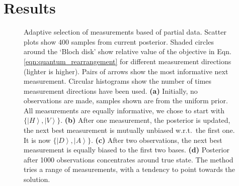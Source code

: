 
\section{Results}

\begin{figure}

	\caption[Illustration of adaptive tomography on a single-photon system]{Adaptive selection of measurements based of partial data. Scatter plots show 400 samples from current posterior. Shaded circles around the `Bloch disk' show relative value of the objective in Eqn.\,\eqref{eqn:quantum_rearrangement} for different measurement directions (lighter is higher). Pairs of arrows show the most informative next measurement. Circular histograms show the number of times measurement directions have been used. \textbf{(a)}  Initially, no observations are made, samples shown are from the uniform prior. All measurements are equally informative, we chose to start with $\{\left\vert H\right\rangle,\left\vert V\right\rangle\}$. \textbf{(b)}  After one measurement, the posterior is updated, the next best measurement is mutually unbiased w.r.t.\ the first one. It is now $\{\left\vert D\right\rangle,\left\vert A\right\rangle\}$. \textbf{(c)} After two observations, the next best measurement is equally biased to the first two bases. \textbf{(d)} Posterior after 1000 observations concentrates around true state. The method tries a range of measurements, with a tendency to point towards the solution.
	\label{fig:Bloch_disk}}
\end{figure}
